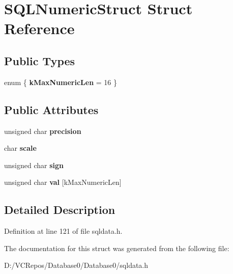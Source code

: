 \hypertarget{struct_s_q_l_numeric_struct}{}\section{S\+Q\+L\+Numeric\+Struct Struct Reference}
\label{struct_s_q_l_numeric_struct}
\subsection*{Public Types}
\begin{DoxyCompactItemize}
\item 
\mbox{\label{struct_s_q_l_numeric_struct_af178d84bfa0a1cc8b74fd218ac8492de}} 
enum \{ {\bfseries k\+Max\+Numeric\+Len} = 16
 \}
\end{DoxyCompactItemize}
\subsection*{Public Attributes}
\begin{DoxyCompactItemize}
\item 
\mbox{\label{struct_s_q_l_numeric_struct_ab66f5fa7b5ea728f33abcabb885403bb}} 
unsigned char {\bfseries precision}
\item 
\mbox{\label{struct_s_q_l_numeric_struct_a67ea82149e45a522ac89926c6db2353f}} 
char {\bfseries scale}
\item 
\mbox{\label{struct_s_q_l_numeric_struct_a14e4e92b6be7a11f3565f6058c86098a}} 
unsigned char {\bfseries sign}
\item 
\mbox{\label{struct_s_q_l_numeric_struct_a837aff67f9469c8e3910b9f674afc1f2}} 
unsigned char {\bfseries val} \mbox{[}k\+Max\+Numeric\+Len\mbox{]}
\end{DoxyCompactItemize}


\subsection{Detailed Description}


Definition at line 121 of file sqldata.\+h.



The documentation for this struct was generated from the following file\+:\begin{DoxyCompactItemize}
\item 
D\+:/\+V\+C\+Repos/\+Database0/\+Database0/sqldata.\+h\end{DoxyCompactItemize}

